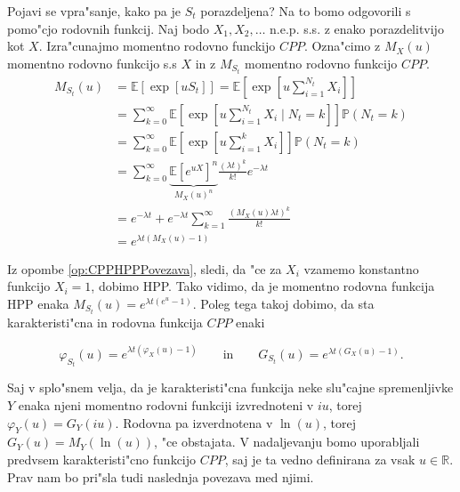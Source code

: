 \documentclass[12pt, a4paper, reqno]{amsart}
\theoremstyle{definition} %
\theoremstyle{plain} %
\newcommand{\R}{\mathbb{R}}
\newcommand{\E}{\mathbb{E}}
\newcommand{\Prob}{\mathbb{P}}
\newcommand{\1}{\mathds{1}}
\begin{document}
    \noindent
    Pojavi se vpra"sanje, kako pa je $S_t$ porazdeljena? Na to bomo odgovorili s pomo"cjo rodovnih
    funkcij. Naj bodo $X_1, X_2, \dots$ n.e.p. s.s.  z enako porazdelitvijo kot $X$.
    Izra"cunajmo momentno rodovno funckijo $CPP$. Ozna"cimo z $M_X(u)$ momentno rodovno funkcijo 
    s.s $X$ in z $M_{S_t}$ momentno rodovno funkcijo $CPP$.
    \begin{align}
        M_{S_t}(u) 
                &= \E\left[\exp\left[uS_t\right]\right] = \nonumber
                    \E\left[\exp\left[u\sum_{i = 1}^{N_t}X_i\right]\right] \nonumber\\
                &= \sum_{k=0}^{\infty}
                    \E\left[\exp\left[u\sum_{i = 1}^{N_t}X_i\mid N_t=k\right]\right]\Prob\left(N_t = k\right) \nonumber \\ 
                &= \sum_{k=0}^{\infty}
                    \E\left[\exp\left[u\sum_{i = 1}^kX_i\right]\right]\Prob\left(N_t = k\right) \nonumber \\
                &= \sum_{k=0}^{\infty}
                    \underbrace{\E\left[e^{uX}\right]^n}_{M_X(u)^n}\frac{(\lambda t)^k}{k!}e^{-\lambda t} \label{eq:MomentS_t}\\ 
                &= e^{-\lambda t} + e^{-\lambda t}\sum_{k=1}^\infty\frac{\left(M_X(u)\lambda t\right)^k}{k!} \nonumber \\
                &= e^{\lambda t\left(M_X(u) - 1\right)} \nonumber
    \end{align}

    Iz opombe \ref{op:CPPHPPPovezava}, sledi, da "ce za $X_i$ vzamemo konstantno funkcijo 
    $X_i = 1$, dobimo HPP. Tako vidimo, da je momentno rodovna funkcija HPP enaka 
    $M_{S_t}(u) = e^{\lambda t\left(e^u - 1\right)}$. Poleg tega takoj dobimo, da sta 
    karakteristi"cna in rodovna funkcija $CPP$ enaki

    \begin{equation*}
        \varphi_{S_t}(u) = e^{\lambda t\left(\varphi_X(u) - 1\right)} \qquad \text{in} \qquad 
        G_{S_t}(u) = e^{\lambda t\left(G_X(u) - 1\right)}.
    \end{equation*} 

    \noindent
    Saj v splo"snem velja, da je karakteristi"cna funkcija neke slu"cajne spremenljivke $Y$ enaka
    njeni momentno rodovni funkciji izvrednoteni v $iu$, torej $\varphi_Y(u) = G_Y(iu)$. Rodovna pa 
    izverdnotena v $\ln(u)$, torej $G_Y(u) = M_Y(\ln(u))$, "ce obstajata.
    V nadaljevanju bomo uporabljali predvsem karakteristi"cno funkcijo $CPP$, saj je ta vedno definirana 
    za vsak $u\in\R$. Prav nam bo pri"sla tudi naslednja povezava med njimi.
\end{document}
